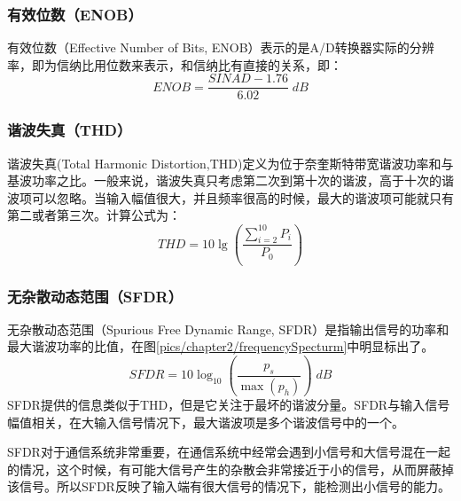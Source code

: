 	\subsubsection{有效位数（ENOB）}
	
		有效位数（Effective Number of Bits, ENOB）表示的是A/D转换器实际的分辨率，即为信纳比用位数来表示，和信纳比有直接的关系，即：
		\begin{equation}
			ENOB = \frac{{SINAD - 1.76}}{{6.02}}\;dB
		\end{equation}
	
	\subsubsection{谐波失真（THD）}
		谐波失真(Total Harmonic Distortion,THD)定义为位于奈奎斯特带宽谐波功率和与基波功率之比。一般来说，谐波失真只考虑第二次到第十次的谐波，高于十次的谐波项可以忽略。当输入幅值很大，并且频率很高的时候，最大的谐波项可能就只有第二或者第三次。计算公式为：
		\begin{equation}
			THD = 10\lg \left( {\frac{{\sum\limits_{i = 2}^{10} {{P_i}} }}{{{P_0}}}} \right)
		\end{equation}
	
	
	\subsubsection{无杂散动态范围（SFDR）}
		无杂散动态范围（Spurious Free Dynamic Range, SFDR）是指输出信号的功率和最大谐波功率的比值，在图\ref{pics/chapter2/frequencySpecturm}中明显标出了。
		\begin{equation}
			SFDR = 10{\log _{10}}\left( {\frac{{{p_s}}}{{\max \left( {{p_h}} \right)}}} \right)\;dB
		\end{equation}
		SFDR提供的信息类似于THD，但是它关注于最坏的谐波分量。SFDR与输入信号幅值相关，在大输入信号情况下，最大谐波项是多个谐波信号中的一个。\par
		SFDR对于通信系统非常重要，在通信系统中经常会遇到小信号和大信号混在一起的情况，这个时候，有可能大信号产生的杂散会非常接近于小的信号，从而屏蔽掉该信号。所以SFDR反映了输入端有很大信号的情况下，能检测出小信号的能力。
